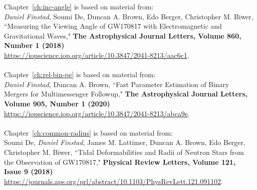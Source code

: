 \documentclass[12pt,notitlepage]{report}
\begin{document}
\havededicationtrue
\dedication{To Mom, Dad, \& Lynn}
\haveminorfalse
{}
\copyrighttrue
\doctoratetrue
\figurespagetrue
\tablespagetrue
\electronicsubmittrue
\Acknowledgments{
}
\beforepreface
{}
Chapter~\ref{ch:inc-angle} is based on material from: \\
\textit{Daniel Finstad}, Soumi De, Duncan A. Brown, Edo Berger, Christopher M. Biwer, ``Measuring the Viewing Angle of GW170817 with Electromagnetic and Gravitational Waves," \textbf{The Astrophysical Journal Letters, Volume 860, Number 1 (2018)} \\
\url{https://iopscience.iop.org/article/10.3847/2041-8213/aac6c1}.
\\ \\
Chapter~\ref{ch:rel-bin-pe} is based on material from:  \\ 
\textit{Daniel Finstad}, Duncan A. Brown, ``Fast Parameter Estimation of Binary Mergers for Multimessenger Followup," \textbf{The Astrophysical Journal Letters, Volume 905, Number 1 (2020)} \\ \url{https://iopscience.iop.org/article/10.3847/2041-8213/abca9e}.
\\ \\
Chapter~\ref{ch:common-radius} is based on material from:  \\ 
Soumi De, \textit{Daniel Finstad}, James M. Lattimer, Duncan A. Brown, Edo Berger, Christopher M. Biwer, ``Tidal Deformabilities and Radii of Neutron Stars from the Observation of GW170817," \textbf{Physical Review Letters, Volume 121, Issue 9 (2018)} \\ \url{https://journals.aps.org/prl/abstract/10.1103/PhysRevLett.121.091102}.
\\ \\


\afterpreface

\label{ch:intro}


\label{ch:pe-technique}


\label{ch:inc-angle}


\label{ch:rel-bin-pe}

\end{document}
